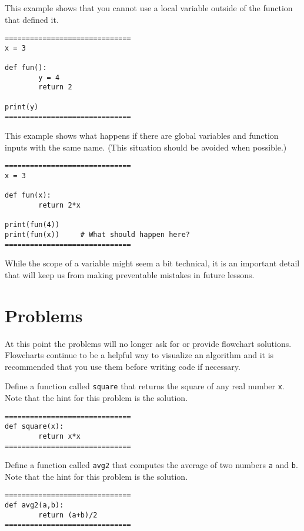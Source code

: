 \documentclass{ximera}
\begin{document}
This example shows that you cannot use a local variable outside of the function that defined it.

\begin{verbatim}
==============================
x = 3

def fun():
        y = 4
        return 2

print(y)
==============================
\end{verbatim}

This example shows what happens if there are global variables and function inputs with the same name. (This situation should be avoided when possible.)

\begin{verbatim}
==============================
x = 3

def fun(x):
        return 2*x

print(fun(4))
print(fun(x))     # What should happen here?
==============================
\end{verbatim}

While the scope of a variable might seem a bit technical, it is an important detail that will keep us from making preventable mistakes in future lessons.

\section{Problems}

At this point the problems will no longer ask for or provide flowchart solutions. Flowcharts continue to be a helpful way to visualize an algorithm and it is recommended that you use them before writing code if necessary. 

\begin{question}
	Define a function called \verb|square| that returns the square of any real number \verb|x|. Note that the hint for this problem is the solution.
	\begin{hint}
\begin{verbatim}
==============================
def square(x):
        return x*x
==============================
\end{verbatim}
	\end{hint}
\end{question}

\begin{question}
	Define a function called \verb|avg2| that computes the average of two numbers \verb|a| and \verb|b|. Note that the hint for this problem is the solution.
	\begin{hint}
\begin{verbatim}
==============================
def avg2(a,b):
        return (a+b)/2
==============================
\end{verbatim}
	\end{hint}
\end{question}
\end{document}

